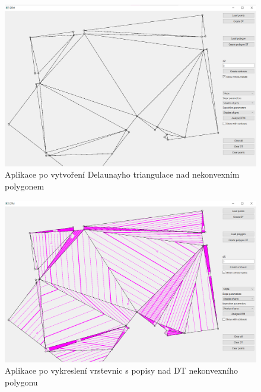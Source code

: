 \documentclass[11pt]{article}
\begin{document}
\begin{figure}[htbh]
	\centering
	\captionsetup{justification=centering}
	\includegraphics[scale=0.35]{images/vystup_CreateDT_pol.png} 
	\caption{Aplikace po vytvoření Delaunayho triangulace nad nekonvexním polygonem}
	\label{fig:vystup_CreateDT_pol}
\end{figure} 
\begin{figure}[htbh]
	\centering
	\captionsetup{justification=centering}
	\includegraphics[scale=0.35]{images/vystup_CreateContourswLabels_pol.png} 
	\caption{Aplikace po vykreslení vrstevnic s popisy nad DT nekonvexního polygonu}	\label{fig:vystup_CreateContourssLabels_pol}
\end{figure} 
\end{document}
